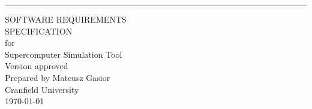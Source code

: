 \begin{flushright}
    \rule{16cm}{5pt}\vskip1cm
    \begin{bfseries}
        \Huge{SOFTWARE REQUIREMENTS\\ SPECIFICATION}\\
        \vspace{1.9cm}
        for\\
        \vspace{1.9cm}
	    Supercomputer Simulation Tool\\
        \vspace{1.9cm}
        \LARGE{Version \myversion approved}\\
        \vspace{1.9cm}
        Prepared by Mateusz Gasior\\
        \vspace{1.9cm}
        Cranfield University\\
        \vspace{1.9cm}
        \today\\
    \end{bfseries}
\end{flushright}
